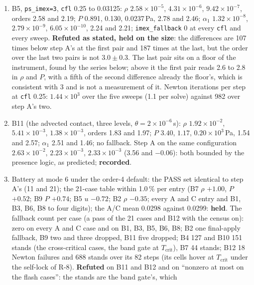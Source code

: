 \documentclass[11pt,a4paper]{article}
\newcommand{\code}[1]{\texttt{\small #1}}
\begin{document}
\begin{enumerate}[nosep]
\item B5, \code{ps\_imex=3}, \code{cfl} 0.25 to 0.03125: $\rho$
      $2.58\times10^{-5}$, $4.31\times10^{-6}$, $9.42\times10^{-7}$,
      orders 2.58 and 2.19; $P$ 0.891, 0.130, 0.0237\,Pa, 2.78 and
      2.46; $\alpha_1$ $1.32\times10^{-8}$, $2.79\times10^{-9}$,
      $6.05\times10^{-10}$, 2.24 and 2.21; \code{imex\_fallback} 0 at
      every \code{cfl} and every sweep.  \textbf{Refuted as stated,
      held on the size}: the differences are 107 times below step A's
      at the first pair and 187 times at the last, but the order over
      the last two pairs is not $3.0\pm0.3$.  The last pair sits on a
      floor of the instrument, found by the series below; above it the
      first pair reads 2.6 to 2.8 in $\rho$ and $P$, with a fifth of
      the second difference already the floor's, which is consistent
      with 3 and is not a measurement of it.  Newton iterations per
      step at \code{cfl} 0.25: $1.44\times10^{3}$ over the five sweeps
      (1.1 per solve) against 982 over step A's two.
\item B11 (the advected contact, three levels, $\theta = 2\times10^{-6}$\,s):
      $\rho$ $1.92\times10^{-2}$, $5.41\times10^{-3}$,
      $1.38\times10^{-3}$, orders 1.83 and 1.97; $P$ $3.40$, $1.17$,
      $0.20\times10^{3}$\,Pa, 1.54 and 2.57; $\alpha_1$ 2.51 and 1.46;
      no fallback.  Step A on the same configuration $2.63\times10^{-2}$,
      $2.23\times10^{-3}$, $2.33\times10^{-3}$ (3.56 and $-0.06$): both
      bounded by the presence logic, as predicted; \textbf{recorded}.
\item Battery at mode 6 under the order-4 default: the PASS set
      identical to step A's (11 and 21); the 21-case table within
      1.0\,\% per entry (B7 $\rho$ $+1.00$, $P$ $+0.52$; B9 $P$ $+0.74$;
      B5 $u$ $-0.72$; B2 $\rho$ $-0.35$; every A and C entry and B1, B3,
      B6, B8 to four digits); the A/C mean 0.0298 against 0.0299:
      \textbf{held}.  The fallback count per case (a pass of the 21
      cases and B12 with the census on): zero on every A and C case and
      on B1, B3, B5, B6, B8; B2 one final-apply fallback, B9 two and
      three dropped, B11 five dropped; B4 127 and B10 151 stands (the
      cross-critical cases, the band gate at $T_{\mathrm{crit}}$), B7
      44 stands; B12 18 Newton failures and 688 stands over its 82
      steps (its cells hover at $T_{\mathrm{crit}}$ under the self-lock
      of R-8).  \textbf{Refuted} on B11 and B12 and on ``nonzero at
      most on the flash cases'': the stands are the band gate's, which

\end{enumerate}
\end{document}
